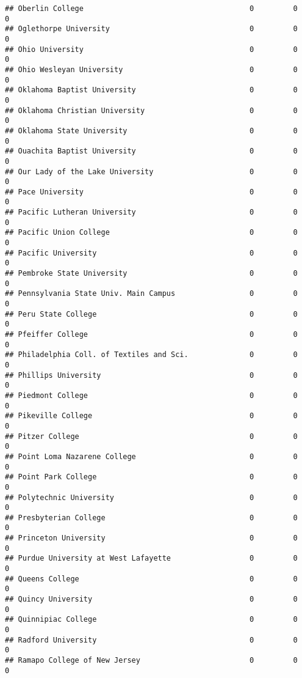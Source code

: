 \documentclass[
]{article}
\begin{document}
\begin{verbatim}
## Oberlin College                                      0         0           0
## Oglethorpe University                                0         0           0
## Ohio University                                      0         0           0
## Ohio Wesleyan University                             0         0           0
## Oklahoma Baptist University                          0         0           0
## Oklahoma Christian University                        0         0           0
## Oklahoma State University                            0         0           0
## Ouachita Baptist University                          0         0           0
## Our Lady of the Lake University                      0         0           0
## Pace University                                      0         0           0
## Pacific Lutheran University                          0         0           0
## Pacific Union College                                0         0           0
## Pacific University                                   0         0           0
## Pembroke State University                            0         0           0
## Pennsylvania State Univ. Main Campus                 0         0           0
## Peru State College                                   0         0           0
## Pfeiffer College                                     0         0           0
## Philadelphia Coll. of Textiles and Sci.              0         0           0
## Phillips University                                  0         0           0
## Piedmont College                                     0         0           0
## Pikeville College                                    0         0           0
## Pitzer College                                       0         0           0
## Point Loma Nazarene College                          0         0           0
## Point Park College                                   0         0           0
## Polytechnic University                               0         0           0
## Presbyterian College                                 0         0           0
## Princeton University                                 0         0           0
## Purdue University at West Lafayette                  0         0           0
## Queens College                                       0         0           0
## Quincy University                                    0         0           0
## Quinnipiac College                                   0         0           0
## Radford University                                   0         0           0
## Ramapo College of New Jersey                         0         0           0

\end{verbatim}
\end{document}
